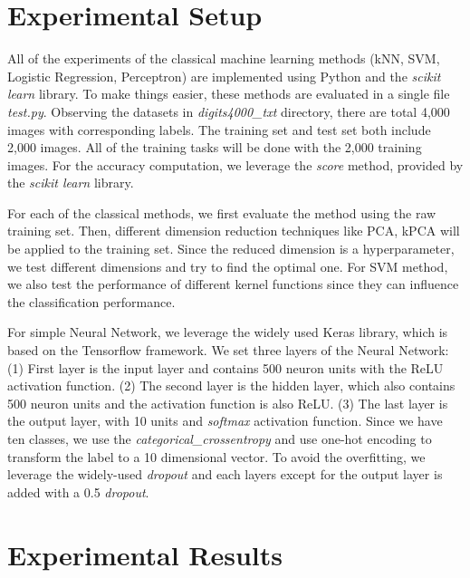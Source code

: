 \documentclass[12pt]{article}
\begin{document}
\section{\fontsize{12}{12}\selectfont Experimental Setup}
All of the experiments of the classical machine learning methods (kNN, SVM, Logistic Regression, Perceptron) are implemented using Python and the \emph{scikit learn} library. To make things easier, these methods are evaluated in a single file \emph{test.py}. Observing the datasets in \emph{digits4000\_txt} directory, there are total 4,000 images with corresponding labels. The training set and test set both include 2,000 images. All of the training tasks will be done with the 2,000 training images. For the accuracy computation, we leverage the \emph{score} method, provided by the \emph{scikit learn} library.

For each of the classical methods, we first evaluate the method using the raw training set. Then, different dimension reduction techniques like PCA, kPCA will be applied to the training set. Since the reduced dimension is a hyperparameter, we test different dimensions and try to find the optimal one. For SVM method, we also test the performance of different kernel functions since they can influence the classification performance.

For simple Neural Network, we leverage the widely used Keras library, which is based on the Tensorflow framework. We set three layers of the Neural Network: (1) First layer is the input layer and contains 500 neuron units with the ReLU activation function. (2) The second layer is the hidden layer, which also contains 500 neuron units and the activation function is also ReLU. (3) The last layer is the output layer, with 10 units and \emph{softmax} activation function. Since we have ten classes, we use the \emph{categorical\_crossentropy} and use one-hot encoding to transform the label to a 10 dimensional vector. To avoid the overfitting, we leverage the widely-used \emph{dropout} and each layers except for the output layer is added with a 0.5 \emph{dropout}.

\section{\fontsize{12}{12}\selectfont Experimental Results}
\end{document}
